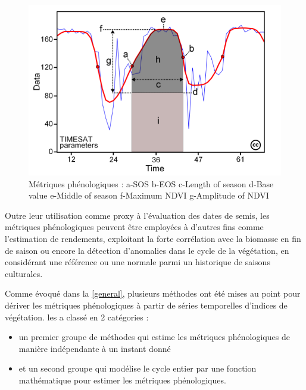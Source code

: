 \begin{figure}[htbp]
 \begin{center}
  \includegraphics[scale=0.45]{synthese_biblio/metrics.png} 
 \end{center}
 \caption{Métriques phénologiques \citep{Eklundh2017} : a-SOS b-EOS c-Length of season d-Base value e-Middle of season f-Maximum NDVI g-Amplitude of NDVI}
 \label{metrics}
\end{figure}
\vspace{5mm}

Outre leur utilisation comme proxy à l'évaluation des dates de semis, les métriques phénologiques peuvent être employées à d'autres fins comme l'estimation de rendements, exploitant 
la forte corrélation avec la biomasse en fin de saison ou encore la détection d'anomalies dans le cycle de la végétation, en considérant une référence ou une normale parmi un 
historique de saisons culturales.

\vspace{5mm}

Comme évoqué dans la \cref{general}, plusieurs méthodes ont été mises au point pour dériver les métriques phénologiques à partir de séries temporelles d'indices de végétation.
\citet{Atzberger2013} les a classé en 2 catégories : 
\begin{itemize}
 \item un premier groupe de méthodes qui estime les métriques phénologiques de manière indépendante à un instant donné 
 \item et un second groupe qui modélise le cycle entier par une fonction mathématique pour estimer les métriques phénologiques.
\end{itemize}

